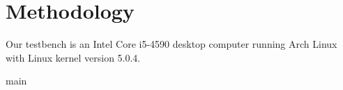 \chapter{Methodology}

Our testbench is an Intel Core i5-4590 desktop computer running Arch Linux with
Linux kernel version 5.0.4.

{main}




